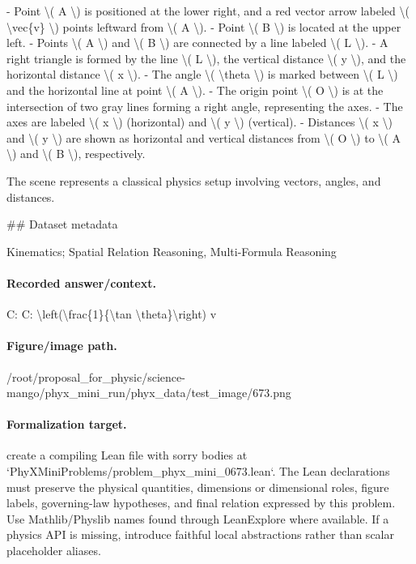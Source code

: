 - Point \textbackslash{}( A \textbackslash{}) is positioned at the lower right, and a red vector arrow labeled \textbackslash{}( \textbackslash{}vec\{v\} \textbackslash{}) points leftward from \textbackslash{}( A \textbackslash{}). 
- Point \textbackslash{}( B \textbackslash{}) is located at the upper left.
- Points \textbackslash{}( A \textbackslash{}) and \textbackslash{}( B \textbackslash{}) are connected by a line labeled \textbackslash{}( L \textbackslash{}).
- A right triangle is formed by the line \textbackslash{}( L \textbackslash{}), the vertical distance \textbackslash{}( y \textbackslash{}), and the horizontal distance \textbackslash{}( x \textbackslash{}).
- The angle \textbackslash{}( \textbackslash{}theta \textbackslash{}) is marked between \textbackslash{}( L \textbackslash{}) and the horizontal line at point \textbackslash{}( A \textbackslash{}).
- The origin point \textbackslash{}( O \textbackslash{}) is at the intersection of two gray lines forming a right angle, representing the axes.
- The axes are labeled \textbackslash{}( x \textbackslash{}) (horizontal) and \textbackslash{}( y \textbackslash{}) (vertical).
- Distances \textbackslash{}( x \textbackslash{}) and \textbackslash{}( y \textbackslash{}) are shown as horizontal and vertical distances from \textbackslash{}( O \textbackslash{}) to \textbackslash{}( A \textbackslash{}) and \textbackslash{}( B \textbackslash{}), respectively. 

The scene represents a classical physics setup involving vectors, angles, and distances.

\#\# Dataset metadata

Kinematics; Spatial Relation Reasoning, Multi-Formula Reasoning

\paragraph{Recorded answer/context.}
C: C: \textbackslash{}left(\textbackslash{}frac\{1\}\{\textbackslash{}tan \textbackslash{}theta\}\textbackslash{}right) v

\paragraph{Figure/image path.}
/root/proposal\_for\_physic/science-mango/phyx\_mini\_run/phyx\_data/test\_image/673.png

\paragraph{Formalization target.}
create a compiling Lean file with sorry bodies at `PhyXMiniProblems/problem\_phyx\_mini\_0673.lean`. The Lean declarations must preserve the physical quantities, dimensions or dimensional roles, figure labels, governing-law hypotheses, and final relation expressed by this problem.
Use Mathlib/Physlib names found through LeanExplore where available. If a physics API is missing, introduce faithful local abstractions rather than scalar placeholder aliases.

